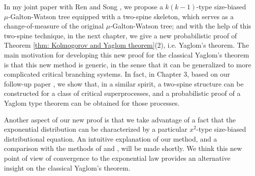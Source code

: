 \documentclass[UTF8]{pkuthss}
\theoremstyle{plain}
\theoremstyle{definition}
\numberwithin{equation}{section}
\begin{document}
In my joint paper with Ren and Song \cite{RenSongSun2018A-2-spine}, we propose a $k(k-1)$-type size-biased $\mu$-Galton-Watson tree equipped with a two-spine skeleton, which serves as a change-of-measure of the original $\mu$-Galton-Watson tree;
and with the help of this two-spine technique, in the next chapter, we give a new probabilistic proof of Theorem \ref{thm: Kolmogorov and Yaglom theorem}(2), i.e. Yaglom's theorem.
The main motivation for developing this new proof for the classical Yaglom's theorem is that this new method is generic, in the sense that it can be generalized to more complicated critical branching systems.
In fact, in Chapter 3, based on our follow-up
paper \cite{RenSongSun2017Spine}, we show that, in a similar spirit, a two-spine structure can be constructed for a class of critical superprocesses, and a probabilistic proof of a Yaglom type theorem can be obtained for those processes.



Another aspect of our new proof is that we take advantage of a fact that the exponential distribution can be characterized by a particular $x^2$-type size-biased distributional equation.
An intuitive explanation of our method,
and a comparison with the methods of \cite{Geiger2000A-new} and \cite{LyonsPemantlePeres1995Conceptual}, will be made shortly.
We think this new point of view of convergence to the exponential law provides an alternative insight on the classical Yaglom's theorem.
\end{document}
